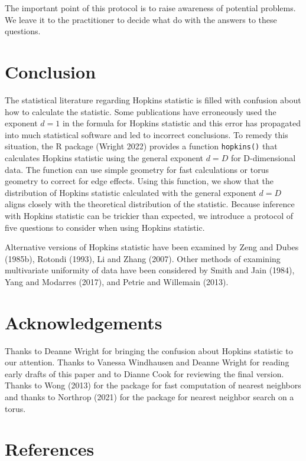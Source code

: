 The important point of this protocol is to raise awareness of potential problems. We leave it to the practitioner to decide what do with the answers to these questions.

\hypertarget{conclusion}{%
\section{Conclusion}\label{conclusion}}

The statistical literature regarding Hopkins statistic is filled with confusion about how to calculate the statistic. Some publications have erroneously used the exponent \(d=1\) in the formula for Hopkins statistic and this error has propagated into much statistical software and led to incorrect conclusions. To remedy this situation, the R package  (Wright 2022) provides a function \texttt{hopkins()} that calculates Hopkins statistic using the general exponent \(d=D\) for D-dimensional data. The function can use simple geometry for fast calculations or torus geometry to correct for edge effects. Using this function, we show that the distribution of Hopkins statistic calculated with the general exponent \(d=D\) aligns closely with the theoretical distribution of the statistic. Because inference with Hopkins statistic can be trickier than expected, we introduce a protocol of five questions to consider when using Hopkins statistic.

Alternative versions of Hopkins statistic have been examined by Zeng and Dubes (1985b), Rotondi (1993), Li and Zhang (2007). Other methods of examining multivariate uniformity of data have been considered by Smith and Jain (1984), Yang and Modarres (2017), and Petrie and Willemain (2013).

\hypertarget{acknowledgements}{%
\section{Acknowledgements}\label{acknowledgements}}

Thanks to Deanne Wright for bringing the confusion about Hopkins statistic to our attention.
Thanks to Vanessa Windhausen and Deanne Wright for reading early drafts of this paper and to Dianne Cook for reviewing the final version.
Thanks to Wong (2013) for the  package for fast computation of nearest neighbors and thanks to Northrop (2021) for the  package for nearest neighbor search on a torus.

\hypertarget{references}{%
\section*{References}\label{references}}

